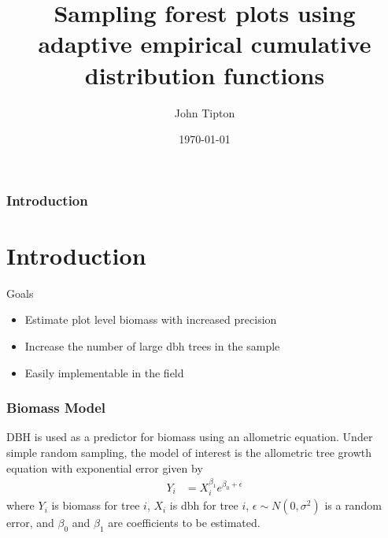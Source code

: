 \documentclass{beamer}
\title{Sampling forest plots using adaptive empirical cumulative distribution functions}
\author{John Tipton}
\date{\today}
\begin{document}
%
\begin{frame}
  \maketitle
\end{frame}
%
\begin{frame}
  \frametitle{Introduction}
  \section{Introduction}
  Goals
  \begin{itemize}
    \item Estimate plot level biomass with increased precision \vspace{3mm}
    \item Increase the number of large dbh trees in the sample \vspace{3mm}
    \item Easily implementable in the field
  \end{itemize}
\end{frame}
%
\begin{frame}
  \frametitle{Biomass Model}
  DBH is used as a predictor for biomass using an allometric equation.   Under simple random sampling, the model of interest is the allometric tree growth equation with exponential error given by 
  \begin{align}
  \label{1}
     Y_i & =  X_i^{\beta_1} e^{\beta_0 + \epsilon}
  \end{align}
  where $Y_i$ is biomass for tree $i$, $X_i$ is dbh for tree $i$, $\epsilon \sim N(0, \sigma^2)$ is a random error, and $\beta_0$ and $\beta_1$ are coefficients to be estimated.
\end{frame}
%
\end{document}
